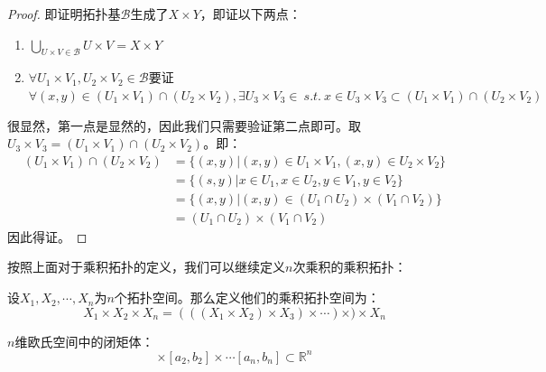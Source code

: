 \documentclass[lang=cn,10pt,device=pad]{elegantbook}
\newcommand{\tpj}{\mathcal{B}}
\newcommand{\st}{~s.t.~}
\newcommand{\dabing}{\displaystyle\bigcup}
\newcommand{\dkh}[1]{\{#1\}}
\begin{document}
\begin{proof}
	即证明拓扑基$\tpj$生成了$X\times Y$，即证以下两点：
	\begin{enumerate}
		\item $\dabing_{U\times V\in \tpj}U\times V = X\times Y$
		\item $\forall U_{1}\times V_{1},U_{2}\times V_{2}\in \tpj$要证$\forall (x,y)\in (U_{1}\times V_{1})\cap(U_{2}\times V_{2}),\exists U_{3}\times V_{3}\in \st x\in U_{3}\times V_{3}\subset (U_{1}\times V_{1})\cap(U_{2}\times V_{2})$
	\end{enumerate}
	很显然，第一点是显然的，因此我们只需要验证第二点即可。取$U_{3}\times V_{3} = (U_{1}\times V_{1})\cap(U_{2}\times V_{2})$。即：
	\begin{equation*}
		\begin{aligned}
			(U_{1}\times V_{1})\cap(U_{2}\times V_{2})&=\dkh{(x,y)|(x,y)\in U_{1}\times V_{1},(x,y)\in U_{2}\times V_{2}}\\
			&=\dkh{(s,y)|x\in U_{1},x\in U_{2},y\in V_{1},y\in V_{2}}\\
			&=\dkh{(x,y)|(x,y)\in (U_{1}\cap U_{2})\times (V_{1}\cap V_{2})}\\
			&=(U_{1}\cap U_{2})\times (V_{1}\cap V_{2})
		\end{aligned}
	\end{equation*}
	因此得证。
\end{proof}
\begin{note}
按照上面对于乘积拓扑的定义，我们可以继续定义$n$次乘积的乘积拓扑：
\begin{definition}
	设$X_{1},X_{2},\cdots ,X_{n}$为$n$个拓扑空间。那么定义他们的乘积拓扑空间为：
	\begin{equation*}
		X_{1}\times X_{2} \times X_{n} = (((X_{1}\times X_{2})\times X_{3})\times\cdots )\times)\times X_{n}
	\end{equation*}
\end{definition}	
\end{note}
\begin{example}[$n$维欧氏空间中的闭矩体]
	$n$维欧氏空间中的闭矩体：
	\begin{equation*}
		[a_1,b_1]\times[a_2,b_{2}]\times \cdots [a_{n},b_{n}]\subset \mathbb{R}^{n}
	\end{equation*}
\end{example}
\end{document}
